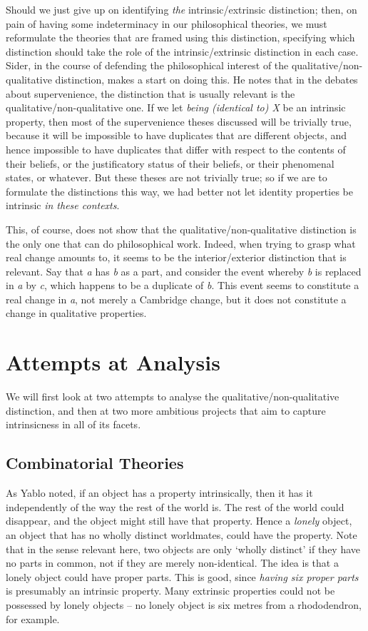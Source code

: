 Should we just give up on identifying \textit{the} intrinsic/extrinsic distinction; then, on pain of having some indeterminacy in our philosophical theories, we must reformulate the theories that are framed using this distinction, specifying which distinction should take the role of the intrinsic/extrinsic distinction in each case. Sider, in the course of defending the philosophical interest of the qualitative/non-qualitative distinction, makes a start on doing this. He notes that in the debates about supervenience, the distinction that is usually relevant is the qualitative/non-qualitative one. If we let \textit{being (identical to) X} be an intrinsic property, then most of the supervenience theses discussed will be trivially true, because it will be impossible to have duplicates that are different objects, and hence impossible to have duplicates that differ with respect to the contents of their beliefs, or the justificatory status of their beliefs, or their phenomenal states, or whatever. But these theses are not trivially true; so if we are to formulate the distinctions this way, we had better not let identity properties be intrinsic \textit{in these contexts}.

This, of course, does not show that the qualitative/non-qualitative distinction is the only one that can do philosophical work. Indeed, when trying to grasp what real change amounts to, it seems to be the interior/exterior distinction that is relevant. Say that \textit{a} has \textit{b} as a part, and consider the event whereby \textit{b} is replaced in \textit{a} by \textit{c}, which happens to be a duplicate of \textit{b}. This event seems to constitute a real change in \textit{a}, not merely a Cambridge change, but it does not constitute a change in qualitative properties.

\section{Attempts at Analysis}
We will first look at two attempts to analyse the qualitative/non-qualitative distinction, and then at two more ambitious projects that aim to capture intrinsicness in all of its facets.

\subsection{Combinatorial Theories}
As Yablo noted, if an object has a property intrinsically, then it has it independently of the way the rest of the world is. The rest of the world could disappear, and the object might still have that property. Hence a \textit{lonely} object, an object that has no wholly distinct worldmates, could have the property. Note that in the sense relevant here, two objects are only `wholly distinct' if they have no parts in common, not if they are merely non-identical. The idea is that a lonely object could have proper parts. This is good, since \textit{having six proper parts} is presumably an intrinsic property. Many extrinsic properties could not be possessed by lonely objects -- no lonely object is six metres from a rhododendron, for example.

